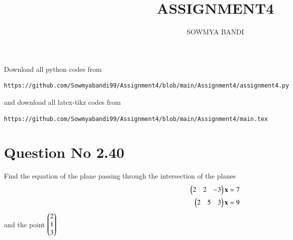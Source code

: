 \documentclass[journal,12pt,twocolumn]{IEEEtran}
\begin{document}
     \def\rightbox#1{\makebox[0in][r]{#1}}
     \def\centbox#1{\makebox[0in]{#1}}
     \def\topbox#1{\raisebox{-\baselineskip}[0in][0in]{#1}}
     \def\midbox#1{\raisebox{-0.5\baselineskip}[0in][0in]{#1}}
\vspace{3cm}
\title{ASSIGNMENT4}
\author{SOWMYA BANDI}
\maketitle
\newpage
\bigskip
\renewcommand{\thefigure}{\theenumi}
\renewcommand{\thetable}{\theenumi}
Download all python codes from 
\begin{lstlisting}
https://github.com/Sowmyabandi99/Assignment4/blob/main/Assignment4/assignment4.py
\end{lstlisting}
%
and download all latex-tikz codes from 
%
\begin{lstlisting}
https://github.com/Sowmyabandi99/Assignment4/blob/main/Assignment4/main.tex
\end{lstlisting}
%
\section{Question No 2.40}
Find the equation of the plane passing through the intersection of the planes 
\begin{align}
\begin{pmatrix}2 & 2 & -3\end{pmatrix}\mathbf{x}&=7 \label{eq1}
\\
\begin{pmatrix}2 & 5 & 3\end{pmatrix}\mathbf{x}&=9 \label{eq2}
\end{align}
%
and the point $\begin{pmatrix}2\\ 1 \\ 3\end{pmatrix}$ \label{eq3}
\end{document}
